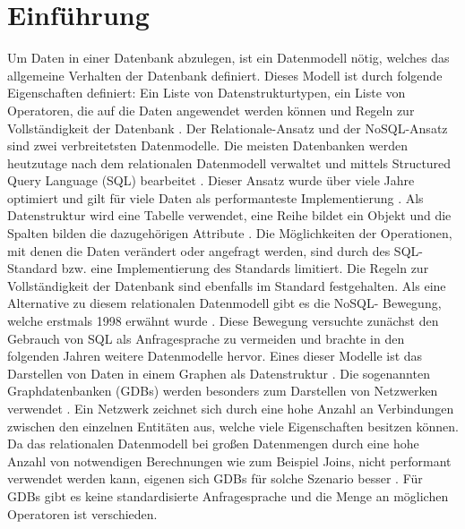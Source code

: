 
\chapter{Einführung} %

\label{Kaptiel1} %


\newcommand{\keyword}[1]{\textit{#1}}
\newcommand{\tabhead}[1]{\textbf{#1}}
\newcommand{\code}[1]{\texttt{#1}}
\newcommand{\file}[1]{\texttt{\bfseries#1}}
\newcommand{\option}[1]{\texttt{\itshape#1}}

Um Daten in einer Datenbank abzulegen, ist ein Datenmodell nötig, welches  das allgemeine Verhalten der Datenbank definiert. Dieses Modell ist durch folgende Eigenschaften definiert: Ein Liste von Datenstrukturtypen, ein Liste von Operatoren, die auf die Daten angewendet werden können und Regeln zur Vollständigkeit der Datenbank \parencite{codd1981data}. Der Relationale-Ansatz und der NoSQL-Ansatz sind zwei verbreitetsten Datenmodelle. \newline
Die meisten Datenbanken werden heutzutage nach dem relationalen Datenmodell verwaltet und mittels Structured Query Language (SQL) bearbeitet \parencite{miller2013graph}. Dieser Ansatz wurde über viele Jahre optimiert und gilt für viele Daten als performanteste Implementierung \parencite{miller2013graph}. Als Datenstruktur wird eine Tabelle verwendet, eine Reihe bildet ein Objekt und die Spalten bilden die dazugehörigen Attribute \parencite{miller2013graph}. Die Möglichkeiten der Operationen, mit denen die Daten verändert oder angefragt werden, sind durch des SQL-Standard bzw. eine Implementierung des Standards limitiert. Die Regeln zur Vollständigkeit der Datenbank sind ebenfalls im Standard festgehalten. \newline 
Als eine Alternative zu diesem relationalen Datenmodell gibt es die NoSQL- Bewegung, welche erstmals 1998 erwähnt wurde \parencite{strauch2011nosql}. Diese Bewegung versuchte zunächst den Gebrauch von SQL als Anfragesprache zu vermeiden und brachte in den folgenden Jahren weitere Datenmodelle hervor. Eines dieser Modelle ist das Darstellen von Daten in einem Graphen als Datenstruktur \parencite{miller2013graph}. Die sogenannten Graphdatenbanken (GDBs) werden besonders zum Darstellen von Netzwerken verwendet \parencite{han2011survey}. Ein Netzwerk zeichnet sich durch eine hohe Anzahl an Verbindungen zwischen den einzelnen Entitäten aus, welche viele Eigenschaften besitzen können. Da das relationalen Datenmodell bei großen Datenmengen durch eine hohe Anzahl von notwendigen Berechnungen wie zum Beispiel Joins, nicht performant verwendet werden kann, eigenen sich GDBs für solche Szenario besser \parencite{miller2013graph}. Für GDBs gibt es keine standardisierte Anfragesprache und  die Menge an möglichen Operatoren ist verschieden.
